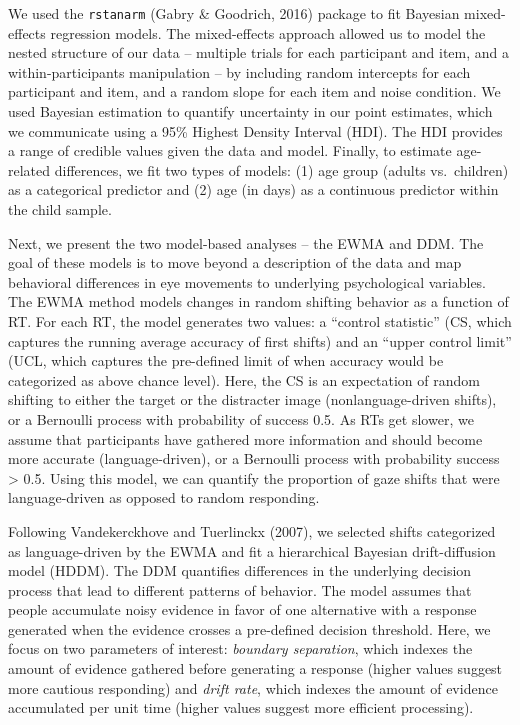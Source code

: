 \documentclass[english,man]{apa6}
\theoremstyle{definition}
\theoremstyle{definition}
\theoremstyle{definition}
\theoremstyle{remark}
\begin{document}
We used the \texttt{rstanarm} (Gabry \& Goodrich, 2016) package to fit
Bayesian mixed-effects regression models. The mixed-effects approach
allowed us to model the nested structure of our data -- multiple trials
for each participant and item, and a within-participants manipulation --
by including random intercepts for each participant and item, and a
random slope for each item and noise condition. We used Bayesian
estimation to quantify uncertainty in our point estimates, which we
communicate using a 95\% Highest Density Interval (HDI). The HDI
provides a range of credible values given the data and model. Finally,
to estimate age-related differences, we fit two types of models: (1) age
group (adults vs.~children) as a categorical predictor and (2) age (in
days) as a continuous predictor within the child sample.

Next, we present the two model-based analyses -- the EWMA and DDM. The
goal of these models is to move beyond a description of the data and map
behavioral differences in eye movements to underlying psychological
variables. The EWMA method models changes in random shifting behavior as
a function of RT. For each RT, the model generates two values: a
\enquote{control statistic} (CS, which captures the running average
accuracy of first shifts) and an \enquote{upper control limit} (UCL,
which captures the pre-defined limit of when accuracy would be
categorized as above chance level). Here, the CS is an expectation of
random shifting to either the target or the distracter image
(nonlanguage-driven shifts), or a Bernoulli process with probability of
success 0.5. As RTs get slower, we assume that participants have
gathered more information and should become more accurate
(language-driven), or a Bernoulli process with probability success
\textgreater{} 0.5. Using this model, we can quantify the proportion of
gaze shifts that were language-driven as opposed to random responding.

Following Vandekerckhove and Tuerlinckx (2007), we selected shifts
categorized as language-driven by the EWMA and fit a hierarchical
Bayesian drift-diffusion model (HDDM). The DDM quantifies differences in
the underlying decision process that lead to different patterns of
behavior. The model assumes that people accumulate noisy evidence in
favor of one alternative with a response generated when the evidence
crosses a pre-defined decision threshold. Here, we focus on two
parameters of interest: \emph{boundary separation}, which indexes the
amount of evidence gathered before generating a response (higher values
suggest more cautious responding) and \emph{drift rate}, which indexes
the amount of evidence accumulated per unit time (higher values suggest
more efficient processing).
\end{document}
